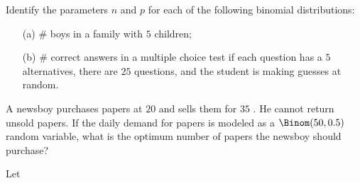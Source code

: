 \begin{problem}[Handout 8, \# 2]
  Identify the parameters \(n\) and \(p\) for each of the following
  binomial distributions:
  \begin{itemize}
  \item[(a)] \(\#\) boys in a family with \(5\) children;
  \item[(b)] \(\#\) correct answers in a multiple choice test if each
    question has a \(5\) alternatives, there are \(25\) questions, and the
    student is making guesses at random.
  \end{itemize}
\end{problem}
\begin{solution}

\end{solution}
\newpage

\begin{problem}[Handout 8, \# 10]
  A newsboy purchases papers at \(20\) \cent{} and sells them for \(35\)
  \cent{}. He cannot return unsold papers. If the daily demand for papers
  is modeled as a \(\Binom(50,0.5)\) random variable, what is the optimum
  number of papers the newsboy should purchase?
\end{problem}
\begin{solution}

\end{solution}
\newpage

\begin{problem}[Handout 8, \# 12]
  Let
\end{problem}
\begin{solution}

\end{solution}
\newpage

\begin{problem}[Handout 8, \# 13]
\end{problem}
\begin{solution}

\end{solution}
\newpage

\begin{problem}[Handout 8, \# 14]
\end{problem}
\begin{solution}

\end{solution}
\newpage

\begin{problem}[Handout 8, \# 15]
\end{problem}
\begin{solution}

\end{solution}
\newpage

